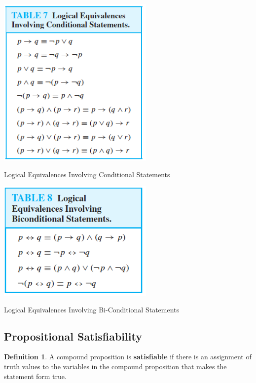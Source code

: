 \documentclass[11pt]{book} %
\theoremstyle {definition}
\newtheorem {definition}{Definition}[section]
\theoremstyle {remark}
\begin{document}
  \begin{table}[htbp]
  \includegraphics [width=3in]{Table-1-6-7-LogicalEquivalencesInvolvingConditionalStatements}
  \caption{Logical Equivalences Involving Conditional Statements}
  \label{table:logicalequivalencesinvolvingconditionalstatements}
  \end{table}
  
  
  \begin{table}[htbp]
  \includegraphics [width=3in]{Table-1-6-8-LogicalEquivalencesInvolvingBiconditonalStatements}
  \caption{Logical Equivalences Involving Bi-Conditional Statements}
  \label{table:LogicalEquivalenceInvolvingBiconditionalStatements}
  \end{table}


    \subsection {Propositional Satisfiability}
\begin{definition}
A compound proposition is \textbf{satisfiable} if there is an assignment of truth values to the variables in the compound proposition that makes the statement form true.
\end{definition}
\end{document}
